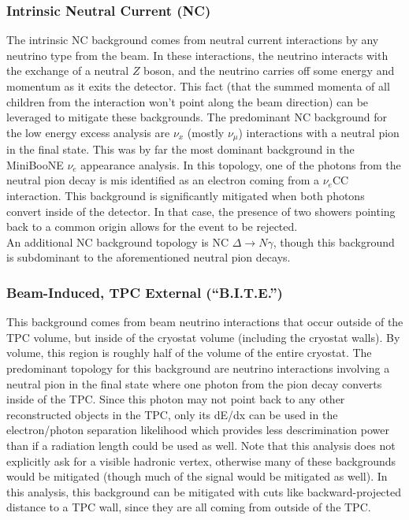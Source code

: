 \subsubsection{Intrinsic Neutral Current (NC)}
The intrinsic NC background comes from neutral current interactions by any neutrino type from the beam. In these interactions, the neutrino interacts with the exchange of a neutral $Z$ boson, and the neutrino carries off some energy and momentum as it exits the detector. This fact (that the summed momenta of all children from the interaction won't point along the beam direction) can be leveraged to mitigate these backgrounds. The predominant NC background for the low energy excess analysis are $\nu_x$ (mostly $\nu_\mu$) interactions with a neutral pion in the final state. This was by far the most dominant background in the MiniBooNE $\nu_e$ appearance analysis. In this topology, one of the photons from the neutral pion decay is mis identified as an electron coming from a $\nu_e$CC interaction. This background is significantly mitigated when both photons convert inside of the detector. In that case, the presence of two showers pointing back to a common origin allows for the event to be rejected.\\

An additional NC background topology is NC $\Delta \rightarrow N\gamma$, though this background is subdominant to the aforementioned neutral pion decays.

\subsubsection{Beam-Induced, TPC External (``B.I.T.E.'')}\label{BITE_physics_section}
This background comes from beam neutrino interactions that occur outside of the TPC volume, but inside of the cryostat volume (including the cryostat walls). By volume, this region is roughly half of the volume of the entire cryostat. The predominant topology for this background are neutrino interactions involving a neutral pion in the final state where one photon from the pion decay converts inside of the TPC. Since this photon may not point back to any other reconstructed objects in the TPC, only its dE/dx can be used in the electron/photon separation likelihood which provides less descrimination power than if a radiation length could be used as well. Note that this analysis does not explicitly ask for a visible hadronic vertex, otherwise many of these backgrounds would be mitigated (though much of the signal would be mitigated as well). In this analysis, this background can be mitigated with cuts like backward-projected distance to a TPC wall, since they are all coming from outside of the TPC.

